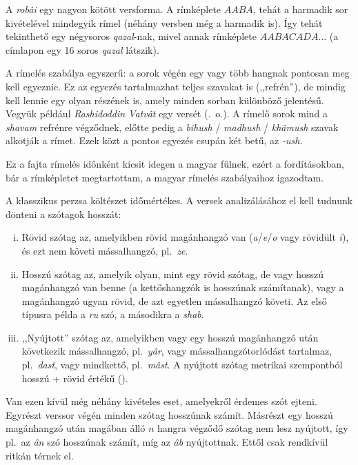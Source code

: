 A \emph{robâi} egy nagyon kötött versforma. A rímképlete $AABA$, tehát
a harmadik sor kivételével mindegyik rímel (néhány versben még a
harmadik is). Így tehát tekinthető egy négysoros \emph{qazal}-nak,
mivel annak rímképlete $AABACADA\dots$ (a címlapon egy 16 soros
\emph{qazal} látszik).

A rímelés szabálya egyszerű: a sorok végén egy vagy több hangnak
pontosan meg kell egyeznie. Ez az egyezés tartalmazhat teljes szavakat
is (,,refrén''), de mindig kell lennie egy olyan részének is, amely
minden sorban különböző jelentésű. Vegyük például \emph{Rashidoddin
Vatvât} egy versét (\pageref{Vatvat}.~o.). A rímelő sorok mind
a \emph{shavam} refrénre végződnek, előtte pedig a \emph{bihush}
/ \emph{madhush} / \emph{khâmush} szavak alkotják a rímet. Ezek közt a
pontos egyezés csupán két betű, az \emph{-ush}.

Ez a fajta rímelés időnként kicsit idegen a magyar fülnek, ezért a
fordításokban, bár a rímképletet megtartottam, a magyar rímelés
szabályaihoz igazodtam.

A klasszikus perzsa költészet időmértékes. A versek analizálásához
el kell tudnunk dönteni a szótagok hosszát:

\begin{enumerate}[i)]
  \item Rövid szótag az, amelyikben rövid magánhangzó van
    (\emph{a}/\emph{e}/\emph{o} vagy rövidült \emph{i}), és ezt nem
    követi mássalhangzó, pl.~\emph{ze}.
  \item Hosszú szótag az, amelyik olyan, mint egy rövid szótag, de
    vagy hosszú magánhangzó van benne (a kettőshangzók is hosszúnak
    számítanak), vagy a magánhangzó ugyan rövid, de azt egyetlen mássalhangzó
    követi. Az első típusra példa a \emph{ru} szó, a másodikra a
    \emph{shab}.
  \item ,,Nyújtott'' szótag az, amelyikben vagy egy hosszú magánhangzó
    után következik mássalhangzó, pl.~\emph{yâr}, vagy
    mássalhangzótorlódást tartalmaz, pl.~\emph{dast}, vagy mindkettő,
    pl.~\emph{mâst}. A nyújtott szótag metrikai szempontból hosszú +
    rövid értékű (\metra{\m\b}).
\end{enumerate}

Van ezen kívül még néhány kivételes eset, amelyekről érdemes szót ejteni.
Egyrészt verssor végén minden szótag hosszúnak számít.
Másrészt egy hosszú magánhangzó után magában álló $n$ hangra végződő
szótag nem lesz nyújtott, így pl.~az \emph{ân} szó hosszúnak számít, míg
az \emph{âb} nyújtottnak. Ettől csak rendkívül ritkán térnek el.

